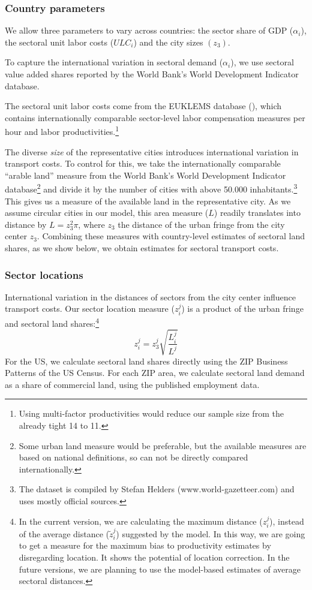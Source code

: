 \documentclass[12pt]{article}
\begin{document}
\subsubsection{Country parameters}
We allow three parameters to vary across countries: the sector share of GDP ($\alpha_i$), the sectoral unit labor costs ($ULC_i$) and the city sizes $(z_3)$.

To capture the international variation in sectoral demand ($\alpha_i$), we use sectoral value added shares reported by the World Bank's World Development Indicator database.

The sectoral unit labor costs come from the EUKLEMS database (), which contains internationally comparable sector-level labor compensation measures per hour and labor productivities.\footnote{Using multi-factor productivities would reduce our sample size from the already tight 14 to 11.}

The diverse \emph{size} of the representative cities introduces international variation in transport costs. To control for this, we take the internationally comparable ``arable land'' measure from the World Bank's World Development Indicator database\footnote{Some urban land measure would be preferable, but the available measures are based on national definitions, so can not be directly compared internationally.} and divide it by the number of cities with above 50.000 inhabitants.\footnote{The dataset is compiled by Stefan Helders (www.world-gazetteer.com) and uses mostly official sources.} This gives us a measure of the available land in the representative city. As we assume circular cities in our model, this area measure ($L$) readily translates into distance by $L=z_3^2\pi$, where $z_3$ the distance of the urban fringe from the city center $z_3$. Combining these measures with country-level estimates of sectoral land shares, as we show below, we obtain estimates for sectoral transport costs.

\subsubsection{Sector locations}

International variation in the distances of sectors from the city center influence transport costs. Our sector location measure ($z_i^j$) is a product of the urban fringe and sectoral land shares:\footnote{In the current version, we are calculating the maximum distance ($z_i^j$), instead of the average distance ($\tilde{z}_i^j$) suggested by the model. In this way, we are going to get a measure for the maximum bias to productivity estimates by disregarding location. It shows the potential of location correction. In the future versions, we are planning to use the model-based estimates of average sectoral distances.}
\begin{equation*}
z_i^j=z_3^j\sqrt{\frac{L_i^j}{L^j}}
\end{equation*}
For the US, we calculate sectoral land shares directly using the ZIP Business Patterns of the US Census. For each ZIP area, we calculate sectoral land demand as a share of commercial land, using the published employment data. %
\end{document}
